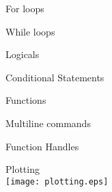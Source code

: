 \documentclass[8pt]{extarticle}
\begin{document}
    \newpage
    
    
    \vspace*{0.5cm}
    
    \begin{multicols}{2}
        \centering
        
        
        \begin{exampleBlock}{For loops}
        \end{exampleBlock}
        
        \begin{exampleBlock}{While loops}
        \end{exampleBlock}
        
        \begin{exampleBlock}{Logicals}
        \end{exampleBlock}
        
        \begin{exampleBlock}{Conditional Statements}
        \end{exampleBlock}
        
        \begin{exampleBlock}{Functions}
        \end{exampleBlock}

        \begin{exampleBlock}{Multiline commands}
        \end{exampleBlock}

        \begin{exampleBlock}{Function Handles}
        \end{exampleBlock}
        
        \begin{exampleBlock}{Plotting}
            \quad\\
            
            \texttt{[image: plotting.eps]}
        \end{exampleBlock}
        
    \end{multicols}
    
\end{document}
